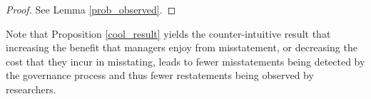 \documentclass[11pt]{amsart}
\begin{document}
\begin{proof}
See Lemma \ref{prob_observed}. 
\end{proof}

Note that Proposition \ref{cool_result} yields the counter-intuitive result that increasing the benefit that managers enjoy from misstatement, or decreasing the cost that they incur in misstating, leads to fewer misstatements being detected by the governance process and thus fewer restatements being observed by researchers.



%
\end{document}
